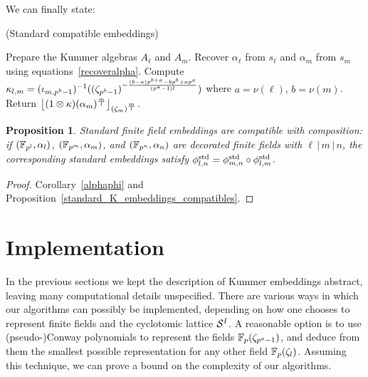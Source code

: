 \documentclass[sigconf]{acmart}
\newtheorem{proposition}[theorem]{Proposition}
\begin{document}
We can finally state:
\begin{algorithm}
  \caption{(Standard compatible embeddings)}
  \label{algo:std_embed}
  \begin{algorithmic}[1]
  \STATE Prepare the Kummer algebras $A_\ell$ and $A_m$.
  \STATE Recover $\alpha_\ell$ from $s_\ell$ and $\alpha_m$ from $s_m$ using equations~\eqref{recoveralpha}.%
  \STATE Compute $\kappa_{l,m}=({\iota_{{m},{p^b-1}}})^{-1}((\zeta_{p^b-1})^{-\frac{(b-a)p^{b+a}-bp^b+ap^a}{(p^a-1)l}})$ where $a=\nu(\ell)$, $b=\nu(m)$.
  \STATE Return $\left\lfloor (1\otimes\kappa)(\alpha_m)^{\frac{m}{l}} \right\rfloor_{(\zeta_m)^{\frac{m}{l}}}$.
  \end{algorithmic}
\end{algorithm}
\begin{proposition}
\label{standard_ff_embeddings_compatibles}
Standard finite field embeddings are compatible with composition:
if $(\mathbb{F}_{p^l},\alpha_l)$, $(\mathbb{F}_{p^m},\alpha_m)$, and $(\mathbb{F}_{p^n},\alpha_n)$ are decorated finite fields
with $\ell\,|\,m\,|\,n$, the corresponding standard embeddings
satisfy ${\phi^{\mathrm{std}}_{{l},{n}}}={\phi^{\mathrm{std}}_{{m},{n}}}\circ{\phi^{\mathrm{std}}_{{l},{m}}}$.
\end{proposition}
\begin{proof}
Corollary~\ref{alphaphi} and Proposition~\ref{standard_K_embeddings_compatibles}.
\end{proof}

\section{Implementation}
\label{sec:implementation}

In the previous sections we kept the description of Kummer embeddings
abstract, leaving many computational details unspecified. %
There are various ways in which our algorithms can possibly be
implemented, depending on how one chooses to represent finite fields
and the cyclotomic lattice $\mathcal{S}^{I}$. %
A reasonable option is to use (pseudo-)Conway polynomials to represent
the fields $\mathbb{F}_p(\zeta_{p^a-1})$, and deduce from them the smallest
possible representation for any other field $\mathbb{F}_p(\zeta_l)$. %
Assuming this technique, we can prove a bound on the complexity of our
algorithms.
\end{document}
